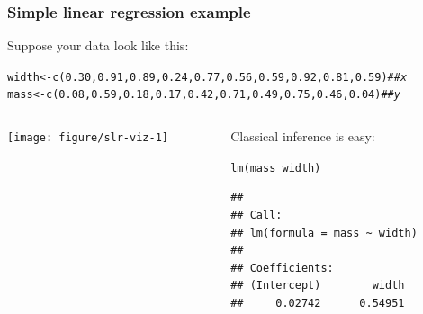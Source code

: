 \documentclass[color=usenames,dvipsnames]{beamer}\usepackage[]{graphicx}\usepackage[]{color}
\makeatletter
\newcommand{\hlnum}[1]{\textcolor[rgb]{0.69,0.494,0}{#1}}%
\newcommand{\hlcom}[1]{\textcolor[rgb]{0.514,0.506,0.514}{\textit{#1}}}%
\newcommand{\hlopt}[1]{\textcolor[rgb]{0,0,0}{#1}}%
\newcommand{\hlstd}[1]{\textcolor[rgb]{0,0,0}{#1}}%
\newcommand{\hlkwb}[1]{\textcolor[rgb]{0,0.341,0.682}{#1}}%
\newcommand{\hlkwd}[1]{\textcolor[rgb]{0.004,0.004,0.506}{#1}}%
\newenvironment{kframe}{%
 \def\at@end@of@kframe{}%
 \ifinner\ifhmode%
  \def\at@end@of@kframe{\end{minipage}}%
  \begin{minipage}{\columnwidth}%
 \fi\fi%
 \def\FrameCommand##1{\hskip\@totalleftmargin \hskip-\fboxsep
 \colorbox{shadecolor}{##1}\hskip-\fboxsep
     \hskip-\linewidth \hskip-\@totalleftmargin \hskip\columnwidth}%
 \MakeFramed {\advance\hsize-\width
   \@totalleftmargin\z@ \linewidth\hsize
   \@setminipage}}%
 {\par\unskip\endMakeFramed%
 \at@end@of@kframe}
\newenvironment{knitrout}{}{} %
\makeatother
\begin{document}
\begin{frame}[fragile]
  \frametitle{Simple linear regression example}
  Suppose your data look like this:
\begin{knitrout}\tiny
{}\color{fgcolor}\begin{kframe}
\begin{alltt}
\hlstd{width} \hlkwb{<-} \hlkwd{c}\hlstd{(}\hlnum{0.30}\hlstd{,} \hlnum{0.91}\hlstd{,} \hlnum{0.89}\hlstd{,} \hlnum{0.24}\hlstd{,} \hlnum{0.77}\hlstd{,} \hlnum{0.56}\hlstd{,} \hlnum{0.59}\hlstd{,} \hlnum{0.92}\hlstd{,} \hlnum{0.81}\hlstd{,} \hlnum{0.59}\hlstd{)}  \hlcom{## x}
\hlstd{mass} \hlkwb{<-} \hlkwd{c}\hlstd{(}\hlnum{0.08}\hlstd{,} \hlnum{0.59}\hlstd{,} \hlnum{0.18}\hlstd{,} \hlnum{0.17}\hlstd{,} \hlnum{0.42}\hlstd{,} \hlnum{0.71}\hlstd{,} \hlnum{0.49}\hlstd{,} \hlnum{0.75}\hlstd{,} \hlnum{0.46}\hlstd{,} \hlnum{0.04}\hlstd{)}   \hlcom{## y}
\end{alltt}
\end{kframe}
\end{knitrout}
\begin{columns}
  \begin{column}{0.5\textwidth}
\begin{knitrout}
\color{fgcolor}
\texttt{[image: figure/slr-viz-1]} 
\end{knitrout}
  \end{column}
  \pause
  \begin{column}{0.5\textwidth}
    Classical inference is easy:
\begin{knitrout}\scriptsize
{}\color{fgcolor}\begin{kframe}
\begin{alltt}
\hlkwd{lm}\hlstd{(mass}\hlopt{~}\hlstd{width)}
\end{alltt}
\begin{verbatim}
## 
## Call:
## lm(formula = mass ~ width)
## 
## Coefficients:
## (Intercept)        width  
##     0.02742      0.54951
\end{verbatim}
\end{kframe}
\end{knitrout}
  \end{column}
\end{columns}
\end{frame}
\end{document}
